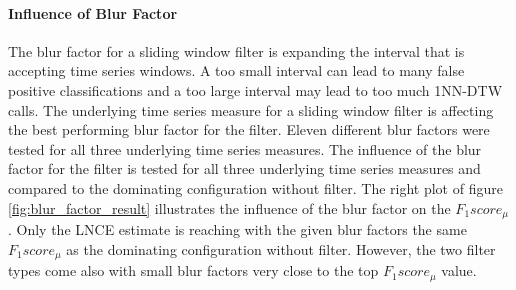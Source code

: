\paragraph{Influence of Blur Factor} \label{influence_of_blur_factor}
The blur factor for a sliding window filter is expanding the interval that is accepting time series windows. A too small
interval can lead to many false positive classifications and a too large interval may lead to too much 1NN-DTW calls.
The underlying time series measure for a sliding window filter is affecting the best performing blur factor for the
filter. Eleven different blur factors were tested for all three underlying time series measures. The influence of
the blur factor for the filter is tested for all three underlying time series measures and compared to the
dominating configuration without filter. The right plot of figure \ref{fig:blur_factor_result} illustrates the influence
of the blur factor on the $F_{1}score_{\mu}$. Only the LNCE estimate is reaching with the given blur factors the same
$F_{1}score_{\mu}$ as the dominating configuration without filter. However, the two filter types come also with small
blur factors very close to the top $F_{1}score_{\mu}$ value.

